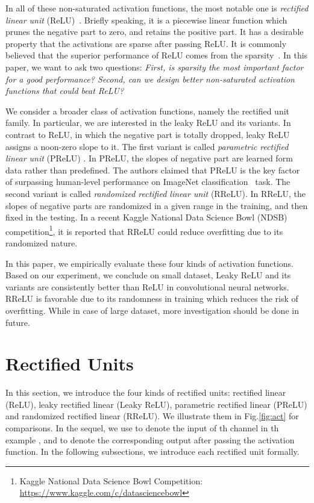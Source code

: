 \documentclass{article}
\begin{document}
In all of these non-saturated activation functions, the most notable one is \emph{rectified linear unit} (ReLU)~\citep{nair2010rectified, sun2014deeply}. Briefly speaking, it is a piecewise linear function which prunes the negative part to zero, and retains the positive part. It has a desirable property that the activations are sparse after passing ReLU. It is commonly believed that the superior performance of ReLU comes from the sparsity~\citep{glorot2011deep, sun2014deeply}. In this paper, we want to ask two questions: \emph{First, is sparsity the most important factor for a good performance? Second, can we design better non-saturated activation functions that could beat ReLU?}



We consider a broader class of activation functions, namely the rectified unit family. In particular, we are interested in the leaky ReLU and its variants. In contrast to ReLU, in which the negative part is totally dropped, leaky ReLU assigns a noon-zero slope to it. The first variant is called \emph{parametric rectified linear unit} (PReLU) \citep{he2015delving}. In PReLU, the slopes of negative part are learned form data rather than predefined. The authors claimed that PReLU is the key factor of  surpassing human-level performance on ImageNet classification~\citep{ILSVRC15} task. The second variant is called \emph{randomized rectified linear unit} (RReLU). In RReLU, the slopes of negative parts are randomized in a given range in the training, and then fixed in the testing. In a recent Kaggle National Data Science Bowl (NDSB) competition\footnote{Kaggle National Data Science Bowl Competition: \url{https://www.kaggle.com/c/datasciencebowl}}, it is reported that RReLU could reduce overfitting due to its randomized nature.

In this paper, we empirically evaluate these four kinds of activation functions. Based on our experiment, we conclude on small dataset, Leaky ReLU and its variants are consistently better than ReLU in convolutional neural networks. RReLU is favorable due to its randomness in training which reduces the risk of overfitting. While in case of large dataset, more investigation should be done in future.

\section{Rectified Units}
In this section, we introduce the four kinds of rectified units: rectified linear (ReLU), leaky rectified linear (Leaky ReLU), parametric rectified linear (PReLU) and randomized rectified linear (RReLU). We illustrate them in Fig.\ref{fig:act} for comparisons. In the sequel, we use   to denote the input of th channel in th example , and  to denote the corresponding output after passing the activation function. In the following subsections, we introduce each rectified unit formally.
\end{document}
